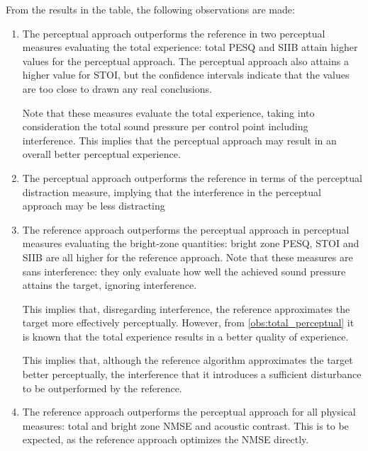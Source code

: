From the results in the table, the following observations are made:
\begin{enumerate}
    \item The perceptual approach outperforms the reference in two perceptual measures evaluating the total experience:
        total PESQ and SIIB attain higher values for the perceptual approach.
        The perceptual approach also attains a higher value for STOI, but the confidence intervals indicate that 
        the values are too close to drawn any real conclusions. 

        Note that these measures evaluate the total experience, taking into consideration the total 
        sound pressure per control point including interference.
        This implies that the perceptual approach may result in an overall better perceptual experience.
        \label{obs:total_perceptual}

    \item The perceptual approach outperforms the reference in terms of the perceptual distraction measure,
        implying that the interference in the perceptual approach may be less distracting 
        \label{obs:distraction}

    \item The reference approach outperforms the perceptual approach in perceptual measures evaluating the 
        bright-zone quantities: bright zone PESQ, STOI and SIIB are all higher for the reference approach.
        Note that these measures are sans interference: they only evaluate how well the achieved sound pressure
        attains the target, ignoring interference.

        This implies that, disregarding interference, the reference approximates the target more effectively 
        perceptually.
        However, from \autoref{obs:total_perceptual} it is known that the total experience results in a 
        better quality of experience. 

        This implies that, although the reference algorithm approximates the target better perceptually, 
        the interference that it introduces a sufficient disturbance to be outperformed by the reference.
        \label{obs:bright_zone_perceptual}

    \item The reference approach outperforms the perceptual approach for all physical measures: 
        total and bright zone NMSE and acoustic contrast.
        This is to be expected, as the reference approach optimizes the NMSE directly.


\end{enumerate}
